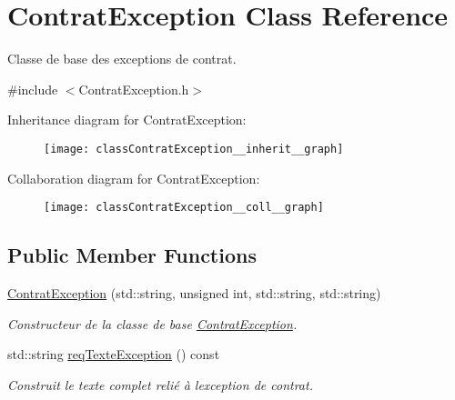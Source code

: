 \hypertarget{classContratException}{}\section{Contrat\+Exception Class Reference}
\label{classContratException}


Classe de base des exceptions de contrat.  




{\ttfamily \#include $<$Contrat\+Exception.\+h$>$}



Inheritance diagram for Contrat\+Exception\+:\nopagebreak
\begin{figure}[H]
\begin{center}
\leavevmode
\texttt{[image: classContratException\_\_inherit\_\_graph]}
\end{center}
\end{figure}


Collaboration diagram for Contrat\+Exception\+:\nopagebreak
\begin{figure}[H]
\begin{center}
\leavevmode
\texttt{[image: classContratException\_\_coll\_\_graph]}
\end{center}
\end{figure}
\subsection*{Public Member Functions}
\begin{DoxyCompactItemize}
\item 
\hyperlink{classContratException_ad6c04fb577e960f87e010b125aa636a0}{Contrat\+Exception} (std\+::string, unsigned int, std\+::string, std\+::string)
\begin{DoxyCompactList}\small\item\em Constructeur de la classe de base \hyperlink{classContratException}{Contrat\+Exception}. \end{DoxyCompactList}\item 
std\+::string \hyperlink{classContratException_a8d20a9959f3b7cc4334165794dbaf1fc}{req\+Texte\+Exception} () const 
\begin{DoxyCompactList}\small\item\em Construit le texte complet relié à l\textquotesingle{}exception de contrat. \end{DoxyCompactList}\end{DoxyCompactItemize}



